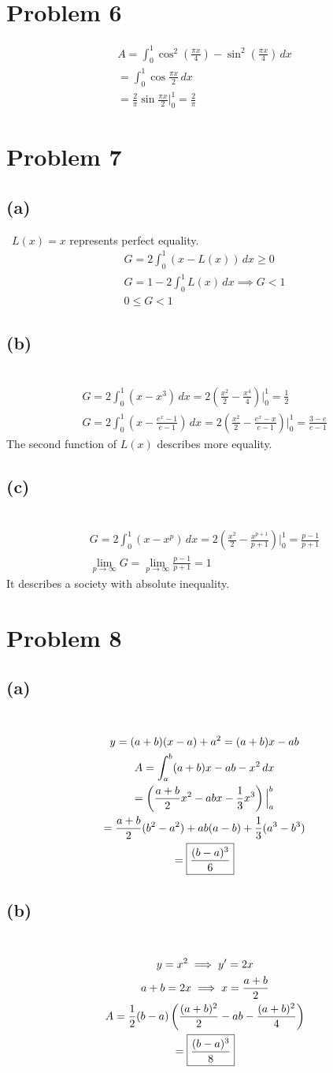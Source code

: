 \documentclass[12pt]{article}
\newcommand*{\paren}[1]{\ensuremath\left(#1\right)}
\newcommand{\vem}{\vspace{0.5em}}
\newcommand{\problem}[1]{\section{Problem #1}}
\newcommand{\subproblem}[1]{\subsection{(#1)} \,}
\begin{document}
\problem{6}
\begin{gather*}
    A=\int_0^1 \cos^2(\frac{\pi x}{4})-\sin ^2 (\frac{\pi x} {4})\, dx\\
    = \int_0^1 \cos \frac{\pi x}{2}\, dx\\
    = \frac{2}{\pi} \sin \frac{\pi x}{2} \Big|^1_0 = \boxed{\frac{2}{\pi}}
\end{gather*}

\problem{7}

\subproblem{a}
$L(x)=x$ represents perfect equality.
\begin{gather*}
    G=2\int_0^1 (x-L(x))\, dx \ge 0\\
    G = 1 - 2 \int_0^1 L(x) \, dx \implies G<1\\
    \boxed{0 \le G <1}
\end{gather*}

\subproblem{b}
\begin{gather*}
    G=2\int_0^1 (x-x^3)\, dx = 2 (\frac{x^2}{2} - \frac{x^4}{4})\Big|^1_0 = \boxed{\frac{1}{2}}\\
    G=2\int_0^1 (x-\frac{e^x-1}{e-1})\, dx =  2(\frac{x^2}{2} - \frac{e^x-x}{e-1})\Big|^1_0=\boxed{\frac{3-e}{e-1}}
\end{gather*}
The second function of $L(x)$ describes more equality.\vem

\subproblem{c}
\begin{gather*}
    G=2\int_0^1 (x-x^p)\, dx = 2(\frac{x^2}{2} - \frac{x^{p+1}}{p+1})\Big|^1_0 = \boxed{ \frac{p-1}{p+1}}\\
    \lim_{p\to \infty} G = \lim_{p \to \infty} \frac{p - 1}{p + 1} = \boxed{1}
\end{gather*}
It describes a society with absolute inequality.

\problem{8}

\subproblem{a}
\begin{gather*}
    y=(a+b)(x-a)+a^2 = (a+b)x-ab\\
    A= \int_a^b (a+b)x-ab-x^2\, dx\\
    = \paren{ \frac{a+b}{2}x^2 -abx -\frac{1}{3}x^3}\Big|^b_a\\
    = \frac{a+b}{2}(b^2-a^2) + ab (a-b) + \frac{1}{3}(a^3-b^3)\\
    = \boxed{\frac{(b-a)^3}{6}}
\end{gather*}

\subproblem{b}
\begin{gather*}
    y=x^2 \implies y'=2x\\
    a+b=2x \implies x = \frac{a+b}{2}\\
    A=\frac{1}{2} (b-a)\paren{ \frac{(a+b)^2}{2}- ab -\frac{(a+b)^2}{4} }\\
    = \boxed{ \frac{(b-a)^3}{8}}
\end{gather*}
\end{document}
